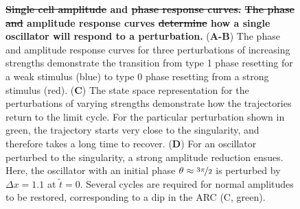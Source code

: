 \documentclass[11pt, letterpaper]{article}
\providecommand{\DIFadd}[1]{{\protect\color{blue}\uwave{#1}}} %
\providecommand{\DIFdel}[1]{{\protect\color{red}\sout{#1}}}                      %
\providecommand{\DIFaddFL}[1]{\DIFadd{#1}} %
\providecommand{\DIFdelFL}[1]{\DIFdel{#1}} %
\providecommand{\DIFaddbeginFL}{} %
\providecommand{\DIFaddendFL}{} %
\providecommand{\DIFdelbeginFL}{} %
\providecommand{\DIFdelendFL}{} %
\begin{document}
\begin{figure}[tbp]
  \begin{center}
    \caption{{\bfseries \DIFdelbeginFL \DIFdelFL{Single cell amplitude }\DIFdelendFL \DIFaddbeginFL \DIFaddFL{Phase }\DIFaddendFL and \DIFdelbeginFL \DIFdelFL{phase response curves.}%
\DIFdelFL{The
    phase and }\DIFdelendFL amplitude response curves \DIFdelbeginFL \DIFdelFL{determine }\DIFdelendFL \DIFaddbeginFL \DIFaddFL{describe }\DIFaddendFL how a
    single oscillator will respond to a perturbation.\DIFaddbeginFL }  \DIFaddendFL ({\bfseries A-B}) The
    phase and amplitude response curves for three perturbations of increasing
    strengths demonstrate the transition from type 1 phase resetting for a weak
    stimulus (blue) to type 0 phase resetting from a strong stimulus (red).
    ({\bfseries C}) The state space representation for the perturbations of
    varying strengths demonstrate how the trajectories return to the limit
    cycle. For the particular perturbation shown in green, the trajectory starts
    very close to the singularity, and therefore takes a long time to recover.
    ({\bfseries D}) For an oscillator perturbed to the singularity, a strong
    amplitude reduction ensues. Here, the oscillator with an initial phase
    $\theta \approx \nicefrac{3\pi}{2}$ is perturbed by $\Delta x = 1.1$ at
    $\tilde{t} = 0$. Several cycles are required for normal amplitudes to be
  restored, corresponding to a dip in the ARC (C, green).}
  \end{center}
\end{figure}
\end{document}
